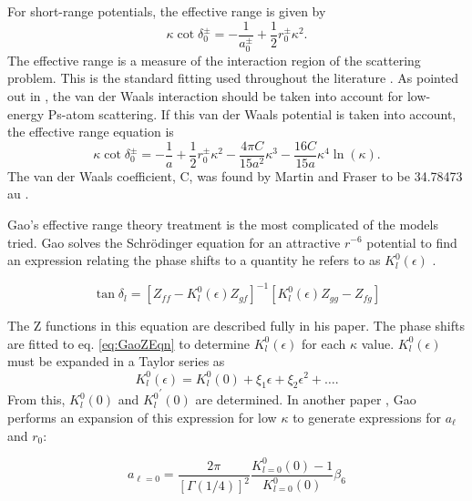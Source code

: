 \documentclass[preprint,showpacs,preprintnumbers,amsmath,amssymb]{revtex4}
\begin{document}
For short-range potentials, the effective range is given by \cite{Bethe1949,Blatt1949}
\begin{equation}
\label{eq:EffectiveRangeShort}
\kappa \cot\delta_0^\pm = -\frac{1}{a_0^\pm} + \frac{1}{2} r_0^\pm \kappa^2.
\end{equation}
The effective range is a measure of the interaction region of the scattering problem. This is the standard fitting used throughout the literature \cite{Blackwood2002,Walters2004,VanReeth2003}. As pointed out in \cite{Fabrikant2014}, the van der Waals interaction should be taken into account for low-energy Ps-atom scattering. If this van der Waals potential is taken into account, the effective range equation is \cite[pg. 668]{Drake2006}
\begin{equation}
\label{eq:EffectiveRangeLongAu}
\kappa \cot\delta_0^\pm = -\frac{1}{a} + \frac{1}{2} r_0^\pm \kappa^2 - \frac{4 \pi C}{15 a^2} \kappa^3 - \frac{16 C}{15 a} \kappa^4 \ln \left(\kappa \right).
\end{equation}
The van der Waals coefficient, C, was found by Martin and Fraser to be 34.78473 au \cite{Martin1980}.

Gao's effective range theory treatment is the most complicated of the models tried. Gao solves the Schr\"{o}dinger equation for an attractive $r^{-6}$ potential to find an expression relating the phase shifts to a quantity he refers to as $K_l^0(\epsilon)$ \cite{Gao1998}.

\begin{equation}
\label{eq:GaoZEqn}
\tan\delta_l = [Z_{ff} - K_l^0(\epsilon) Z_{gf}]^{-1} [K_l^0(\epsilon) Z_{gg} - Z_{fg}]
\end{equation}

\noindent The Z functions in this equation are described fully in his paper. The phase shifts are fitted to eq. \ref{eq:GaoZEqn} to determine $K_l^0(\epsilon)$ for each $\kappa$ value. $K_l^0(\epsilon)$ must be expanded in a Taylor series as
\begin{equation}
\label{eq:GaoKTaylor}
K_l^0(\epsilon) = K_l^0(0) + \xi_1 \epsilon + \xi_2 \epsilon^2 + \ldots.
\end{equation}
From this, $K_l^0(0)$ and ${K_l^0}^\prime(0)$ are determined. In another paper \cite{Gao1998a}, Gao performs an expansion of this expression for low $\kappa$ to generate expressions for $a_\ell$ and $r_0$:

\begin{equation}
\label{eq:GaoScatLenS}
a_{\ell=0} = \frac{2\pi}{[\Gamma(1/4)]^2} \frac{K_{l=0}^0(0) - 1}{K_{l=0}^0(0)} \beta_6
\end{equation}
\end{document}
